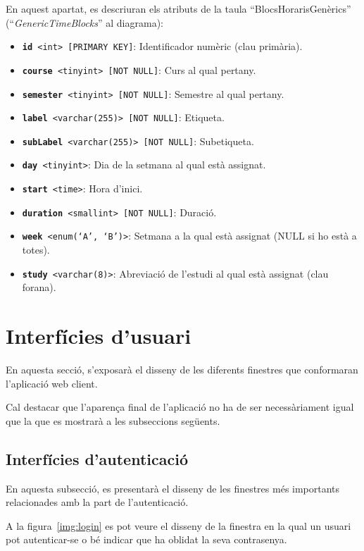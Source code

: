 \documentclass[a4paper,12pt]{ThesisStyle}
\begin{document}
En aquest apartat, es descriuran els atributs de la taula ``BlocsHorarisGenèrics'' (``\textit{GenericTimeBlocks}'' al diagrama):
\begin{itemize}
  \item \texttt{\textbf{id} <int> [PRIMARY KEY]}: Identificador numèric (clau primària).
  \item \texttt{\textbf{course} <tinyint> [NOT NULL]}: Curs al qual pertany.
  \item \texttt{\textbf{semester} <tinyint> [NOT NULL]}: Semestre al qual pertany.
  \item \texttt{\textbf{label} <varchar(255)> [NOT NULL]}: Etiqueta.
  \item \texttt{\textbf{subLabel} <varchar(255)> [NOT NULL]}: Subetiqueta.
  \item \texttt{\textbf{day} <tinyint>}: Dia de la setmana al qual està assignat.
  \item \texttt{\textbf{start} <time>}: Hora d'inici.
  \item \texttt{\textbf{duration} <smallint> [NOT NULL]}: Duració.
  \item \texttt{\textbf{week} <enum(`A', `B')>}: Setmana a la qual està assignat (NULL si ho està a totes).
  \item \texttt{\textbf{study} <varchar(8)>}: Abreviació de l'estudi al qual està assignat (clau forana).
\end{itemize}

\section{Interfícies d'usuari}
\label{sec:interficies_usuari}

En aquesta secció, s'exposarà el disseny de les diferents finestres que conformaran l'aplicació web client.

Cal destacar que l'aparença final de l'aplicació no ha de ser necessàriament igual que la que es mostrarà a les subseccions següents.

\subsection{Interfícies d'autenticació}
\label{subsec:interficies_auth}

En aquesta subsecció, es presentarà el disseny de les finestres més importants relacionades amb la part de l'autenticació.

A la figura~\ref{img:login} es pot veure el disseny de la finestra en la qual un usuari pot autenticar-se o bé indicar que ha oblidat la seva contrasenya.
\end{document}
